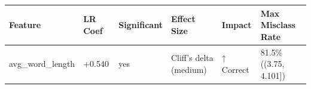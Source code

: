 \begin{tabular}{llllll}
\toprule
Feature & LR Coef & Significant & Effect Size & Impact & Max Misclass Rate \\
\midrule
avg\_word\_length & +0.540 & yes & Cliff's delta (medium) & ↑ Correct & 81.5\% ((3.75, 4.101]) \\
\bottomrule
\end{tabular}
